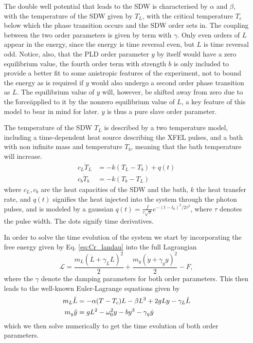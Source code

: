 The double well potential that leads to the SDW is characterised by $\alpha$ and $\beta$, with the temperature of the SDW given by $T_L$, with the critical temperature $T_c$ below which the phase transition occurs and the SDW order sets in. The coupling between the two order parameters is given by term with $\gamma$. Only even orders of $L$ appear in the energy, since the energy is time reversal even, but $L$ is time reversal odd. Notice, also, that the PLD order parameter $y$ by itself would have a zero equilibrium value, the fourth order term with strength $b$ is only included to provide a better fit to some anistropic features of the experiment, not to bound the energy as is required if $y$ would also undergo a second order phase transition as $L$. The equilibrium value of $y$ will, however, be shifted away from zero due to the \"force\" applied to it by the nonzero equilibrium value of $L$, a key feature of this model to bear in mind for later. $y$ is thus a pure slave order parameter.

The temperature of the SDW $T_L$ is described by a two temperature model, including a time-dependent heat source describing the XFEL pulses, and a bath with non infinite mass and temperature $T_b$, meaning that the bath temperature will increase. 
\begin{align}
	c_L \dot{T}_L &= -k(T_L - T_b) + q(t) \\
	c_b \dot{T}_b &= -k(T_b - T_L)
\end{align}
where $c_L, c_b$ are the heat capacities of the SDW and the bath, $k$ the heat transfer rate, and $q(t)$ signifies the heat injected into the system through the photon pulses, and is modeled by a gaussian $q(t) = \frac{f}{\tau \sqrt{\pi}} e^{-(t-t_0)^2/2\tau^2}$, where $\tau$ denotes the pulse width. The dots signify time derivatives.

In order to solve the time evolution of the system we start by incorporating the free energy given by Eq. \ref{eq:Cr_landau} into the full Lagrangian
\begin{equation}
    \mathcal{L} = \frac{m_L (\dot{L} + \gamma_L L)^2}{2} + \frac{m_y (\dot{y} + \gamma_y y)^2}{2} - F,
\end{equation}
where the $\gamma$ denote the damping parameters for both order parameters. This then leads to the well-known Euler-Lagrange equations given by
\begin{align}
    m_L \Ddot{L} &= -\alpha(T-T_c)L - \beta L^3 + 2g L y - \gamma_L \dot{L} \label{eq:L_diffeq}\\
    m_y \Ddot{y} &=gL^2 -\omega_0^2 y  - b y^3 - \gamma_y \dot{y} 
\end{align}
which we then solve numerically to get the time evolution of both order parameters.

